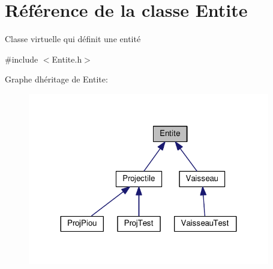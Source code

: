 \hypertarget{class_entite}{}\section{Référence de la classe Entite}
\label{class_entite}


Classe virtuelle qui définit une entité  




{\ttfamily \#include $<$Entite.\+h$>$}



Graphe d\textquotesingle{}héritage de Entite\+:
\nopagebreak
\begin{figure}[H]
\begin{center}
\leavevmode
\includegraphics[width=299pt]{class_entite__inherit__graph}
\end{center}
\end{figure}
